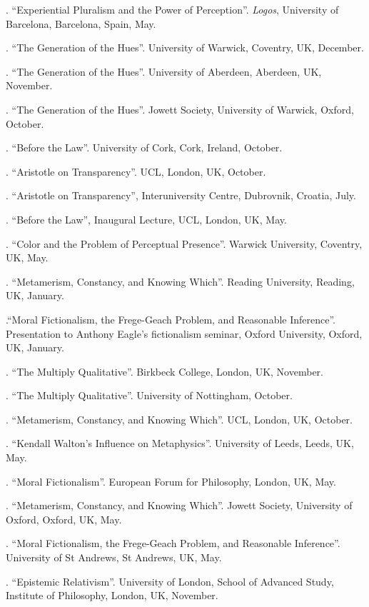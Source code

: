 \documentclass[11pt]{article}
\begin{document}
. ``Experiential Pluralism and the Power of Perception''. \emph{Logos}, University of Barcelona, Barcelona, Spain, May.

. ``The Generation of the Hues''. University of Warwick, Coventry, UK, December.

. ``The Generation of the Hues''. University of Aberdeen, Aberdeen, UK, November.

. ``The Generation of the Hues''. Jowett Society, University of Warwick, Oxford, October.

. ``Before the Law''. University of Cork, Cork, Ireland, October.

. ``Aristotle on Transparency''. UCL, London, UK, October.

. ``Aristotle on Transparency'', Interuniversity Centre, Dubrovnik, Croatia, July.

. ``Before the Law'', Inaugural Lecture, UCL, London, UK, May.

.  ``Color and the Problem of Perceptual Presence''. Warwick University, Coventry, UK, May.

. ``Metamerism, Constancy, and Knowing Which''. Reading University, Reading, UK, January.

.``Moral Fictionalism, the Frege-Geach Problem, and Reasonable Inference''. Presentation to Anthony Eagle's fictionalism seminar, Oxford University, Oxford, UK, January.

. ``The Multiply Qualitative''. Birkbeck College, London, UK, November.

. ``The Multiply Qualitative''. University of Nottingham, October.

. ``Metamerism, Constancy, and Knowing Which''. UCL, London, UK, October.

. ``Kendall Walton's Influence on Metaphysics''. University of Leeds, Leeds, UK, May.

. ``Moral Fictionalism''. European Forum for Philosophy, London, UK, May.

. ``Metamerism, Constancy, and Knowing Which''. Jowett Society, University of Oxford, Oxford, UK, May.

. ``Moral Fictionalism, the Frege-Geach Problem, and Reasonable Inference''. University of St Andrews, St Andrews, UK, May.

. ``Epistemic Relativism''. University of London, School of Advanced Study, Institute of Philosophy, London, UK, November.
\end{document}
